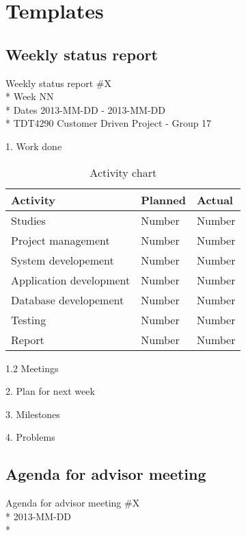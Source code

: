 \chapter{Templates}
\label{AppendixC} 

\section{Weekly status report}

\begin{center}
Weekly status report \#X\\*
Week NN \\*
Dates 2013-MM-DD - 2013-MM-DD \\*
TDT4290 Customer Driven Project - Group 17
\end{center}

1. Work done

\begin{table}
\begin{center}
\begin{tabular}{ l | l | l }
  \hline
  Activity & Planned & Actual \\
  \hline\noalign{\smallskip}\noalign{\smallskip}\hline
  Studies & Number & Number \\
  Project management & Number & Number \\
  System developement & Number & Number \\
  Application development & Number & Number \\
  Database developement & Number & Number \\
  Testing & Number & Number \\
  Report & Number & Number \\
  \hline
\end{tabular}
\end{center}
\caption{Activity chart}
\label{table:activityChart}
\end{table}

1.2 Meetings

2. Plan for next week

3. Milestones

4. Problems


\section{Agenda for advisor meeting}

\begin{center}
Agenda for advisor meeting \#X\\*
2013-MM-DD\\*
\end{center}

